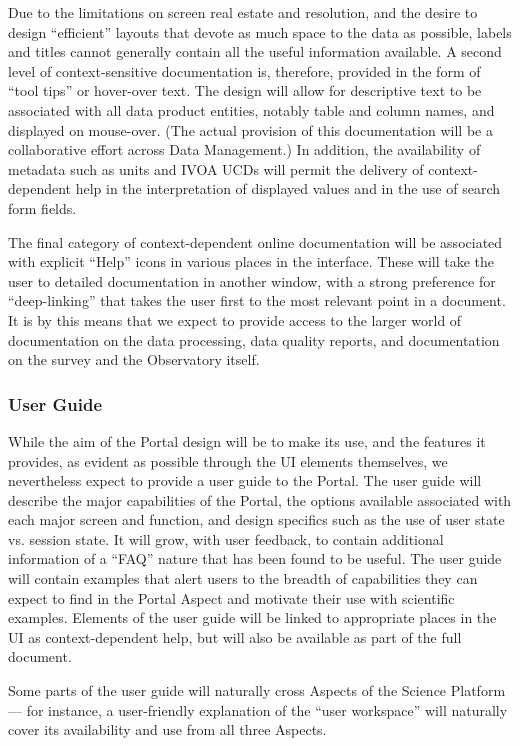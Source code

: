 Due to the limitations on screen real estate and resolution, and the desire to design ``efficient'' layouts that devote as much space to the data as possible, labels and titles cannot generally contain all the useful information available.
A second level of context-sensitive documentation is, therefore, provided in the form of ``tool tips'' or hover-over text.
The design will allow for descriptive text to be associated with all data product entities, notably table and column names, and displayed on mouse-over.
(The actual provision of this documentation will be a collaborative effort across Data Management.)
In addition, the availability of metadata such as units and IVOA UCDs will permit the delivery of context-dependent help in the interpretation of displayed values and in the use of search form fields.

The final category of context-dependent online documentation will be associated with explicit ``Help'' icons in various places in the interface.
These will take the user to detailed documentation in another window, with a strong preference for ``deep-linking'' that takes the user first to the most relevant point in a document.
It is by this means that we expect to provide access to the larger world of documentation on the data processing, data quality reports, and documentation on the survey and the Observatory itself.

\subsubsection{User Guide}\label{user-guide}

While the aim of the Portal design will be to make its use, and the features it provides, as evident as possible through the UI elements themselves, we nevertheless expect to provide a user guide to the Portal.
The user guide will describe the major capabilities of the Portal, the options available associated with each major screen and function, and design specifics such as the use of user state vs. session state.
It will grow, with user feedback, to contain additional information of a ``FAQ'' nature that has been found to be useful.
The user guide will contain examples that alert users to the breadth of capabilities they can expect to find in the Portal Aspect and motivate their use with scientific examples.
Elements of the user guide will be linked to appropriate places in the UI as context-dependent help, but will also be available as part of the full document.

Some parts of the user guide will naturally cross Aspects of the Science Platform --- for instance, a user-friendly explanation of the ``user workspace'' will naturally cover its availability and use from all three Aspects.

